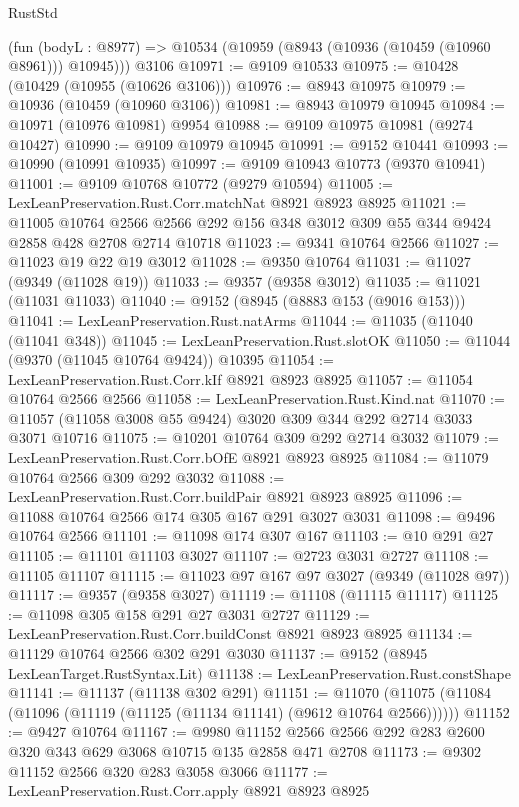 \begin{lexlean}{RustStd}
\begin{coremodule}
    (fun (bodyL : @8977) => @10534 (@10959 (@8943 (@10936 (@10459 (@10960 @8961))) @10945)))
    @3106
@10971 := @9109 @10533
@10975 := @10428 (@10429 (@10955 (@10626 @3106)))
@10976 := @8943 @10975
@10979 := @10936 (@10459 (@10960 @3106))
@10981 := @8943 @10979 @10945
@10984 := @10971 (@10976 @10981) @9954
@10988 := @9109 @10975 @10981 (@9274 @10427)
@10990 := @9109 @10979 @10945
@10991 := @9152 @10441
@10993 := @10990 (@10991 @10935)
@10997 := @9109 @10943 @10773 (@9370 @10941)
@11001 := @9109 @10768 @10772 (@9279 @10594)
@11005 := LexLeanPreservation.Rust.Corr.matchNat @8921 @8923 @8925
@11021 := @11005
    @10764
    @2566
    @2566
    @292
    @156
    @348
    @3012
    @309
    @55
    @344
    @9424
    @2858
    @428
    @2708
    @2714
    @10718
@11023 := @9341 @10764 @2566
@11027 := @11023 @19 @22 @19 @3012
@11028 := @9350 @10764
@11031 := @11027 (@9349 (@11028 @19))
@11033 := @9357 (@9358 @3012)
@11035 := @11021 (@11031 @11033)
@11040 := @9152 (@8945 (@8883 @153 (@9016 @153)))
@11041 := LexLeanPreservation.Rust.natArms
@11044 := @11035 (@11040 (@11041 @348))
@11045 := LexLeanPreservation.Rust.slotOK
@11050 := @11044 (@9370 (@11045 @10764 @9424)) @10395
@11054 := LexLeanPreservation.Rust.Corr.kIf @8921 @8923 @8925
@11057 := @11054 @10764 @2566 @2566
@11058 := LexLeanPreservation.Rust.Kind.nat
@11070 := @11057 (@11058 @3008 @55 @9424) @3020 @309 @344 @292 @2714 @3033 @3071 @10716
@11075 := @10201 @10764 @309 @292 @2714 @3032
@11079 := LexLeanPreservation.Rust.Corr.bOfE @8921 @8923 @8925
@11084 := @11079 @10764 @2566 @309 @292 @3032
@11088 := LexLeanPreservation.Rust.Corr.buildPair @8921 @8923 @8925
@11096 := @11088 @10764 @2566 @174 @305 @167 @291 @3027 @3031
@11098 := @9496 @10764 @2566
@11101 := @11098 @174 @307 @167
@11103 := @10 @291 @27
@11105 := @11101 @11103 @3027
@11107 := @2723 @3031 @2727
@11108 := @11105 @11107
@11115 := @11023 @97 @167 @97 @3027 (@9349 (@11028 @97))
@11117 := @9357 (@9358 @3027)
@11119 := @11108 (@11115 @11117)
@11125 := @11098 @305 @158 @291 @27 @3031 @2727
@11129 := LexLeanPreservation.Rust.Corr.buildConst @8921 @8923 @8925
@11134 := @11129 @10764 @2566 @302 @291 @3030
@11137 := @9152 (@8945 LexLeanTarget.RustSyntax.Lit)
@11138 := LexLeanPreservation.Rust.constShape
@11141 := @11137 (@11138 @302 @291)
@11151 := @11070 (@11075 (@11084 (@11096 (@11119 (@11125 (@11134 @11141) (@9612 @10764 @2566))))))
@11152 := @9427 @10764
@11167 := @9980 @11152 @2566 @2566 @292 @283 @2600 @320 @343 @629 @3068 @10715 @135 @2858 @471 @2708
@11173 := @9302 @11152 @2566 @320 @283 @3058 @3066
@11177 := LexLeanPreservation.Rust.Corr.apply @8921 @8923 @8925

\end{coremodule}
\end{lexlean}
